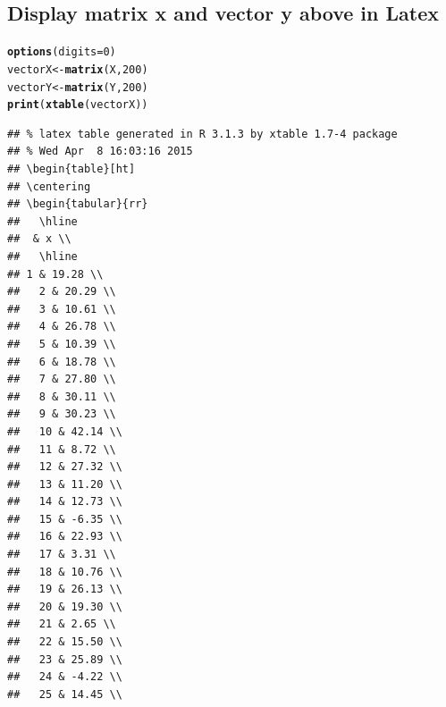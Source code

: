 \documentclass{article}\usepackage[]{graphicx}\usepackage[]{color}
\makeatletter
\newcommand{\hlnum}[1]{\textcolor[rgb]{0.686,0.059,0.569}{#1}}%
\newcommand{\hlstd}[1]{\textcolor[rgb]{0.345,0.345,0.345}{#1}}%
\newcommand{\hlkwb}[1]{\textcolor[rgb]{0.69,0.353,0.396}{#1}}%
\newcommand{\hlkwc}[1]{\textcolor[rgb]{0.333,0.667,0.333}{#1}}%
\newcommand{\hlkwd}[1]{\textcolor[rgb]{0.737,0.353,0.396}{\textbf{#1}}}%
\newenvironment{kframe}{%
 \def\at@end@of@kframe{}%
 \ifinner\ifhmode%
  \def\at@end@of@kframe{\end{minipage}}%
  \begin{minipage}{\columnwidth}%
 \fi\fi%
 \def\FrameCommand##1{\hskip\@totalleftmargin \hskip-\fboxsep
 \colorbox{shadecolor}{##1}\hskip-\fboxsep
     \hskip-\linewidth \hskip-\@totalleftmargin \hskip\columnwidth}%
 \MakeFramed {\advance\hsize-\width
   \@totalleftmargin\z@ \linewidth\hsize
   \@setminipage}}%
 {\par\unskip\endMakeFramed%
 \at@end@of@kframe}
\newenvironment{knitrout}{}{} %
\makeatother
\begin{document}
\subsection{Display matrix x and vector y above in Latex}
\begin{knitrout}
\color{fgcolor}\begin{kframe}
\begin{alltt}
\hlkwd{options}\hlstd{(}\hlkwc{digits} \hlstd{=} \hlnum{0}\hlstd{)}
\hlstd{vectorX} \hlkwb{<-} \hlkwd{matrix}\hlstd{(X,} \hlnum{200}\hlstd{)}
\hlstd{vectorY} \hlkwb{<-} \hlkwd{matrix}\hlstd{(Y,} \hlnum{200}\hlstd{)}
\hlkwd{print}\hlstd{(}\hlkwd{xtable}\hlstd{(vectorX))}
\end{alltt}
\begin{verbatim}
## % latex table generated in R 3.1.3 by xtable 1.7-4 package
## % Wed Apr  8 16:03:16 2015
## \begin{table}[ht]
## \centering
## \begin{tabular}{rr}
##   \hline
##  & x \\ 
##   \hline
## 1 & 19.28 \\ 
##   2 & 20.29 \\ 
##   3 & 10.61 \\ 
##   4 & 26.78 \\ 
##   5 & 10.39 \\ 
##   6 & 18.78 \\ 
##   7 & 27.80 \\ 
##   8 & 30.11 \\ 
##   9 & 30.23 \\ 
##   10 & 42.14 \\ 
##   11 & 8.72 \\ 
##   12 & 27.32 \\ 
##   13 & 11.20 \\ 
##   14 & 12.73 \\ 
##   15 & -6.35 \\ 
##   16 & 22.93 \\ 
##   17 & 3.31 \\ 
##   18 & 10.76 \\ 
##   19 & 26.13 \\ 
##   20 & 19.30 \\ 
##   21 & 2.65 \\ 
##   22 & 15.50 \\ 
##   23 & 25.89 \\ 
##   24 & -4.22 \\ 
##   25 & 14.45 \\ 

\end{verbatim}
\end{kframe}
\end{knitrout}
\end{document}
